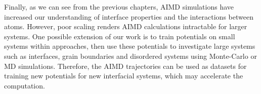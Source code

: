 Finally, as we can see from the previous chapters, AIMD simulations have increased our understanding of interface properties and the interactions between atoms.
However, poor scaling renders AIMD calculations intractable for larger systems.
One possible extension of our work is to train potentials on small systems within \abinitio approaches\cite{Behler2007,Behler2011,Behler2014,Kolb2017}, 
then use these potentials to investigate large systems such as interfaces, grain boundaries and disordered systems using Monte-Carlo or MD simulations.
Therefore, the AIMD trajectories can be used as datasets for training new potentials for new interfacial systems, 
which may accelerate the computation.




